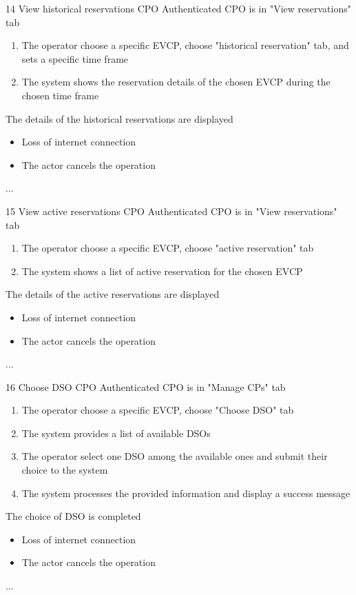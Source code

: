 \usecase
{14}
{View historical reservations} %
{CPO} %
{Authenticated CPO is in "View reservations" tab} %
{ %
    \begin{enumerate}
        \item The operator choose a specific EVCP, choose "historical reservation" tab, and sets a specific time frame
        \item The system shows the reservation details of the chosen EVCP during the chosen time frame
    \end{enumerate}
}
{The details of the historical reservations are displayed} %
{ %
    \begin{itemize}
        \item Loss of internet connection
        \item The actor cancels the operation
    \end{itemize}
}
{ %
    ...
}

\usecase
{15}
{View active reservations} %
{CPO} %
{Authenticated CPO is in "View reservations" tab} %
{ %
    \begin{enumerate}
        \item The operator choose a specific EVCP, choose "active reservation" tab
        \item The system shows a list of active reservation for the chosen EVCP
    \end{enumerate}
}
{The details of the active reservations are displayed} %
{ %
    \begin{itemize}
        \item Loss of internet connection
        \item The actor cancels the operation
    \end{itemize}
}
{ %
    ...
}

\usecase
{16}
{Choose DSO} %
{CPO} %
{Authenticated CPO is in "Manage CPs" tab} %
{ %
    \begin{enumerate}
        \item The operator choose a specific EVCP, choose "Choose DSO" tab
        \item The system provides a list of available DSOs
        \item The operator select one DSO among the available ones and submit their choice to the system
        \item The system processes the provided information and display a success message
    \end{enumerate}
}
{The choice of DSO is completed} %
{ %
    \begin{itemize}
        \item Loss of internet connection
        \item The actor cancels the operation
    \end{itemize}
}
{ %
    ...
}

